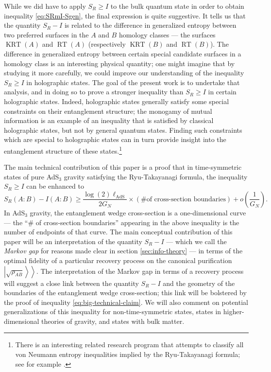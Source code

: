 \documentclass[a4paper,11pt]{article}
\newcommand{\RT}{\operatorname{RT}}
\newcommand{\KRT}{\operatorname{KRT}}
\newcommand{\kett}[1]{\left.\left| #1 \right\rangle \right\rangle}
\begin{document}
While we did have to apply $S_R \geq I$ to the bulk quantum state in order to obtain inequality \eqref{eq:SRmI-Sgen}, the final expression is quite suggestive. It tells us that the quantity $S_R - I$ is related to the difference in generalized entropy between two preferred surfaces in the $A$ and $B$ homology classes --- the surfaces $\KRT(A)$ and $\RT(A)$ (respectively $\KRT(B)$ and $\RT(B)$). The difference in generalized entropy between certain special candidate surfaces in a homology class is an interesting physical quantity; one might imagine that by studying it more carefully, we could improve our understanding of the inequality $S_R \geq I$ in holographic states.  The goal of the present work is to undertake that analysis, and in doing so to prove a stronger inequality than $S_R \geq I$ in certain holographic states. Indeed, holographic states generally satisfy some special constraints on their entanglement structure; the monogamy of mutual information 
\cite{hayden2013holographic} is an example of an inequality that is satisfied by classical holographic states, but not by general quantum states. Finding such constraints which are special to holographic states can in turn provide insight into the entanglement structure of these states.\footnote{There is an interesting related research program that attempts to classify all von Neumann entropy inequalities implied by the Ryu-Takayanagi formula; see for example \cite{bao2015holographiccone, hubeny2018holographicrelations}.}

The main technical contribution of this paper is a proof that in time-symmetric states of pure AdS$_3$ gravity satisfying the Ryu-Takayanagi formula, the inequality $S_R \geq I$ can be enhanced to
\begin{equation} \label{eq:big-technical-claim}
    S_R(A:B) - I(A:B) \geq \frac{\log(2) \ell_{\text{AdS}}}{2 G_N} \times (\text{\# of cross-section boundaries}) + o\left(\frac{1}{G_N}\right).
\end{equation}
In AdS$_3$ gravity, the entanglement wedge cross-section is a one-dimensional curve --- the ``\# of cross-section boundaries'' appearing in the above inequality is the number of endpoints of that curve. The main conceptual contribution of this paper will be an interpretation of the quantity $S_R - I$ --- which we call the \emph{Markov gap} for reasons made clear in section \ref{sec:info-theory} --- in terms of the optimal fidelity of a particular recovery process on the canonical purification $\kett{\sqrt{\rho_{AB}}}$. The interpretation of the Markov gap in terms of a recovery process will suggest a close link between the quantity $S_R - I$ and the geometry of the boundaries of the entanglement wedge cross-section; this link will be bolstered by the proof of inequality \eqref{eq:big-technical-claim}. We will also comment on potential generalizations of this inequality for non-time-symmetric states, states in higher-dimensional theories of gravity, and states with bulk matter.
\end{document}
